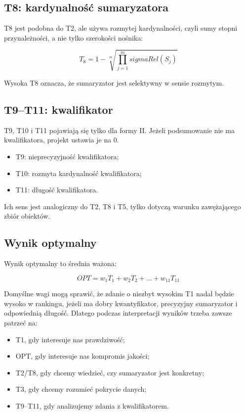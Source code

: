 \documentclass[11pt,a4paper]{article}
\begin{document}
\subsection{T8: kardynalność sumaryzatora}

T8 jest podobna do T2, ale używa rozmytej kardynalności, czyli sumy stopni przynależności, a nie tylko szerokości nośnika:

\[
T_8 = 1 - \sqrt[m]{\prod_{j=1}^{m} sigmaRel(S_j)}
\]

Wysoka T8 oznacza, że sumaryzator jest selektywny w sensie rozmytym.

\subsection{T9--T11: kwalifikator}

T9, T10 i T11 pojawiają się tylko dla formy II. Jeżeli podsumowanie nie ma kwalifikatora, projekt ustawia je na 0.

\begin{itemize}
    \item T9: nieprecyzyjność kwalifikatora;
    \item T10: rozmyta kardynalność kwalifikatora;
    \item T11: długość kwalifikatora.
\end{itemize}

Ich sens jest analogiczny do T2, T8 i T5, tylko dotyczą warunku zawężającego zbiór obiektów.

\subsection{Wynik optymalny}

Wynik optymalny to średnia ważona:

\[
OPT = w_1T_1 + w_2T_2 + \ldots + w_{11}T_{11}
\]

Domyślne wagi mogą sprawić, że zdanie o niezbyt wysokim T1 nadal będzie wysoko w rankingu, jeżeli ma dobry kwantyfikator, precyzyjny sumaryzator i odpowiednią długość. Dlatego podczas interpretacji wyników trzeba zawsze patrzeć na:

\begin{itemize}
    \item T1, gdy interesuje nas prawdziwość;
    \item OPT, gdy interesuje nas kompromis jakości;
    \item T2/T8, gdy chcemy wiedzieć, czy sumaryzator jest konkretny;
    \item T3, gdy chcemy rozumieć pokrycie danych;
    \item T9--T11, gdy analizujemy zdania z kwalifikatorem.
\end{itemize}
\end{document}
